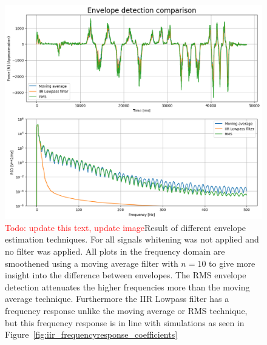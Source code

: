 \begin{figure}[h!t]
	\begin{center}
		\includegraphics[width=1.0\columnwidth]{images/measurement_envelopes.png}
	\end{center}
	\caption{\textcolor{red}{Todo: update this text, update image}Result of different envelope estimation techniques. For all signals whitening was not applied and no filter was applied. All plots in the frequency domain are smoothened using a moving average filter with $n=10$ to give more insight into the difference between envelopes. The RMS envelope detection attenuates the higher frequencies more than the moving average technique. Furthermore the IIR Lowpass filter has a frequency response unlike the moving average or RMS technique, but this frequency response is in line with simulations as seen in Figure~\ref{fig:iir_frequencyresponse_coefficients}}
	\label{fig:result_envelopes}
\end{figure}
